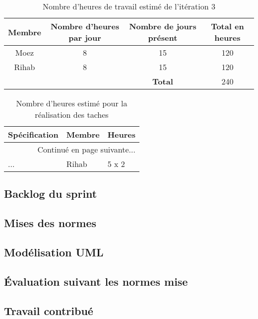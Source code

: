 \begin{table}[htbp]
    \centering
    \begin{tabular}{| c | c | c | c |}
\hline
\textbf{Membre} & \textbf{Nombre d'heures par jour} & \textbf{Nombre de jours présent} & \textbf{Total en heures} \\ \hline
\hline

Moez & 8 & 15 & 120\\ \hline
Rihab & 8 & 15 & 120 \\ \hline
\multicolumn{2}{c|}{} & \textbf{Total} & 240 \\ \cline{3-4}
    \end{tabular}
    \caption{Nombre d'heures de travail estimé de l'itération 3}
    \label{tab:sprint3-capacity}
\end{table}

\begin{center}
    \begin{longtable}{| l | l | l |}
        \caption{Nombre d'heures estimé pour la réalisation des taches}
        \label{tab:sprint3-estimation} \\

 \hline
 \multicolumn{1}{|c}{\textbf{Spécification}} &
 \multicolumn{1}{|c}{\textbf{Membre}} &
 \multicolumn{1}{|c|}{\textbf{Heures}} \\ \hline
 \endhead

 \hline \multicolumn{3}{|r|}{{Continué en page suivante$\dotsc$}} \\ \hline
 \endfoot

 \hline \hline
 \endlastfoot

\hline
... & Rihab & 5 x 2 \\ \hline
\end{longtable}
\end{center}

\subsection{Backlog du sprint}

\subsection{Mises des normes}

\subsection{Modélisation UML}

\subsection{Évaluation suivant les normes mise}

\subsection{Travail contribué}
